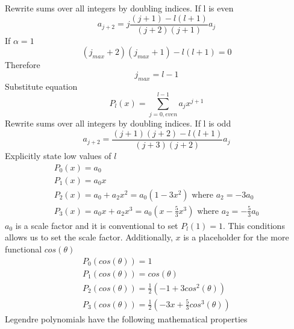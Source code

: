 \documentclass[12pt]{article}
\begin{document}
        Rewrite sums over all integers by doubling indices. If l is even
        \begin{equation} \label{eq: a2-36}
            a_{j+2} = j \frac{(j+1) - l(l+1)}{(j + 2) (j + 1)} a_j
        \end{equation} 
        If $\alpha = 1$
        \begin{equation} \label{eq: a2-37}
            (j_{max} + 2)(j_{max} + 1) - l(l+1) =0
        \end{equation} 
        Therefore
        \begin{equation} \label{eq: a2-38}
            j_{max}=l-1
        \end{equation} 
        Substitute equation
        \begin{equation} \label{eq: a2-39}
            P_l(x) = \sum_{j=0,even}^{l-1} a_j x^{j+1}
        \end{equation} 
        Rewrite sums over all integers by doubling indices. If l is odd
        \begin{equation} \label{eq: a2-40}
            a_{j+2} = \frac{(j+1) (j+2) - l(l+1)}{(j + 3) (j + 2)} a_j
        \end{equation}     
        Explicitly state low values of $l$
        \begin{gather*}
            P_0(x) = a_0
            \\ P_1(x) = a_0x
            \\ P_2(x) = a_0 + a_2 x^2 = a_0(1-3x^2) \text{ where $a_2 = -3a_0$}
            \\ P_3(x) = a_0x + a_2x^3 = a_0(x-\frac{5}{3}x^3) \text{ where $a_2 = -\frac{5}{3} a_0$}
        \end{gather*}
        $a_0$ is a scale factor and it is conventional to set $P_l(1)=1$. This conditions allows us to set the scale factor. Additionally, $x$ is a placeholder for the more functional $cos(\theta)$
        \begin{gather*}
            P_0(cos(\theta)) = 1
            \\ P_1(cos(\theta)) = cos(\theta)
            \\ P_2(cos(\theta)) = \frac{1}{2}(-1+3cos^2(\theta))
            \\ P_3(cos(\theta)) = \frac{1}{2}(-3x + \frac{5}{3}cos^3(\theta))
        \end{gather*}
        \newline Legendre polynomials have the following mathematical properties
\end{document}
